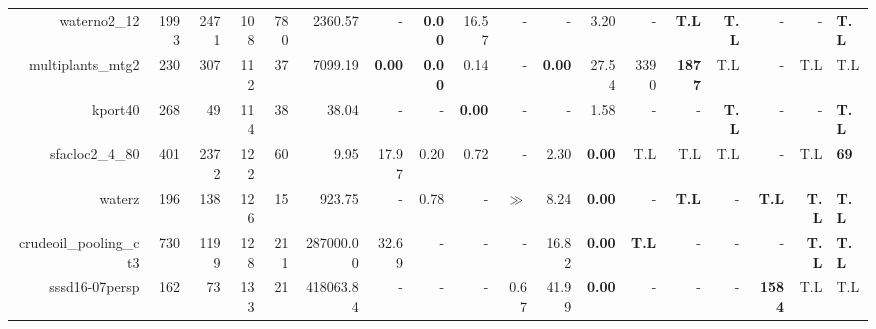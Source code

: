 \begin{table*}[t]
\begin{tabular}{|r|r|r|r|r||r||r|r|r|r|r||r|r|r|r|r|r|}
                      waterno2\_12 &         1993 &          2471 &          108 &           780 &             2360.57 &              - &  \textbf{0.00} &         16.57 &              - &             - &          3.20 &                  - &       \textbf{T.L} &       \textbf{T.L} &                  - &            - & \textbf{T.L} \\ 
                 multiplants\_mtg2 &          230 &           307 &          112 &            37 &             7099.19 &  \textbf{0.00} &  \textbf{0.00} &          0.14 &              - & \textbf{0.00} &         27.54 &               3390 &      \textbf{1877} &                T.L &                  - &          T.L &          T.L \\ 
                           kport40 &          268 &            49 &          114 &            38 &               38.04 &              - &              - & \textbf{0.00} &              - &             - &          1.58 &                  - &                  - &       \textbf{T.L} &                  - &            - & \textbf{T.L} \\ 
                   sfacloc2\_4\_80 &          401 &          2372 &          122 &            60 &                9.95 &          17.97 &           0.20 &          0.72 &              - &          2.30 & \textbf{0.00} &                T.L &                T.L &                T.L &                  - &          T.L &  \textbf{69} \\ 
                            waterz &          196 &           138 &          126 &            15 &              923.75 &              - &           0.78 &             - &          $\gg$ &          8.24 & \textbf{0.00} &                  - &       \textbf{T.L} &                  - &       \textbf{T.L} & \textbf{T.L} & \textbf{T.L} \\ 
            crudeoil\_pooling\_ct3 &          730 &          1199 &          128 &           211 &           287000.00 &          32.69 &              - &             - &              - &         16.82 & \textbf{0.00} &       \textbf{T.L} &                  - &                  - &                  - & \textbf{T.L} & \textbf{T.L} \\ 
                    sssd16-07persp &          162 &            73 &          133 &            21 &           418063.84 &              - &              - &             - &           0.67 &         41.99 & \textbf{0.00} &                  - &                  - &                  - &      \textbf{1584} &          T.L &          T.L \\ 

\end{tabular}
\end{table*}
